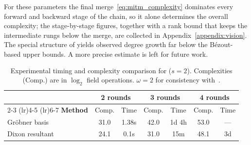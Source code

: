 For these parameters the final merge~\eqref{eq:mitm_complexity} dominates every forward and backward stage of the chain, so it alone determines the overall complexity; the stage-by-stage figures, together with a rank bound that keeps the intermediate rungs below the merge, are collected in Appendix~\ref{appendix:vision}. The special structure of \vision yields observed degree growth far below the B\'ezout-based upper bounds. A more precise estimate is left for future work.

\begin{table}[h]
\centering
\caption{Experimental timing and complexity comparison for \vision ($s=2$). Complexities (Comp.) are in $\log_2$ field operations. $\omega = 2$ for consistency with~\cite{DBLP:conf/asiacrypt/LiuMM24}.}
\label{tab:vision_timing}
\setlength{\tabcolsep}{6pt}
\renewcommand{\arraystretch}{1.2}
\begin{tabular}{lcccccc}
\toprule
& \multicolumn{2}{c}{\textbf{2 rounds}} & \multicolumn{2}{c}{\textbf{3 rounds}} & \multicolumn{2}{c}{\textbf{4 rounds}} \\
\cmidrule(lr){2-3} \cmidrule(lr){4-5} \cmidrule(lr){6-7}
\textbf{Method} & Comp. & Time & Comp. & Time & Comp. & Time \\
\midrule
Gr\"obner basis~\cite{DBLP:conf/asiacrypt/LiuMM24} & 31.0 & 1.38s & 42.0 & 1d 4h & 53.0 & --- \\
Dixon resultant & 24.1 & 0.1s & 31.0 & 15m & 48.1 & 3d \\
\bottomrule
\end{tabular}
\end{table}

